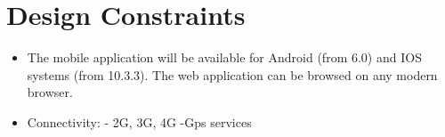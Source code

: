 \section{Design Constraints}
\begin{itemize}
\item The mobile application will be available for Android (from 6.0) and IOS systems (from 10.3.3).
The web application can be browsed on any modern browser. 
\item 
Connectivity:\newline
- 2G, 3G, 4G \newline
-Gps services
\end{itemize}
